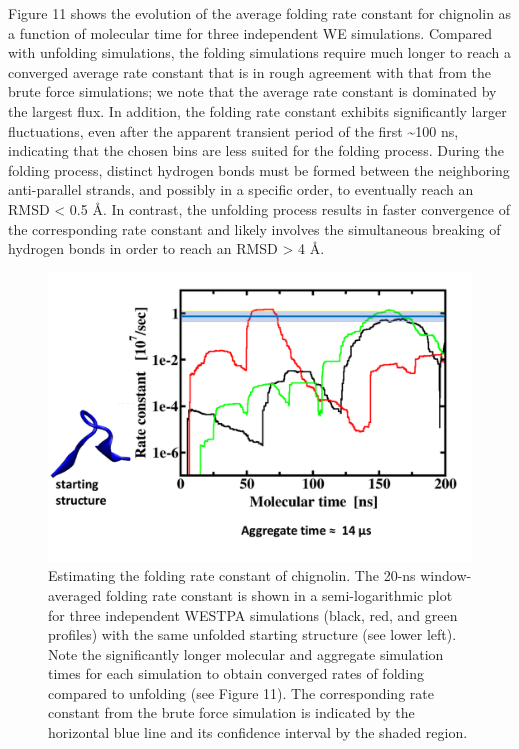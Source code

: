 \documentclass[9pt,tutorial]{livecoms}
\begin{document}
Figure 11 shows the evolution of the average folding rate constant for chignolin as a function of molecular time for three independent WE simulations. 
Compared with unfolding simulations, the folding simulations require much longer to reach a converged average rate constant that is in rough agreement with that from the brute force simulations; we note that the average rate constant is dominated by the largest flux. 
In addition, the folding rate constant exhibits significantly larger fluctuations, even after the apparent transient period of the first \textasciitilde 100 ns, indicating that the chosen bins are less suited for the folding process. 
During the folding process, distinct hydrogen bonds must be formed between the neighboring anti-parallel strands, and possibly in a specific order, to eventually reach an RMSD < 0.5 \AA. 
In contrast, the unfolding process results in faster convergence of the corresponding rate constant and likely involves the simultaneous breaking of hydrogen bonds in order to reach an RMSD > 4 \AA.

\begin{figure}
\includegraphics[width=\linewidth]{Figure11.png}
\caption{Estimating the folding rate constant of chignolin. 
The 20-ns window-averaged folding rate constant is shown in a semi-logarithmic plot for three independent WESTPA simulations (black, red, and green profiles) with the same unfolded starting structure (see lower left). 
Note the significantly longer molecular and aggregate simulation times for each simulation to obtain converged rates of folding compared to unfolding (see Figure 11). 
The corresponding rate constant from the brute force simulation is indicated by the horizontal blue line and its confidence interval by the shaded region.}
\label{fig:view}
\end{figure}
\end{document}
